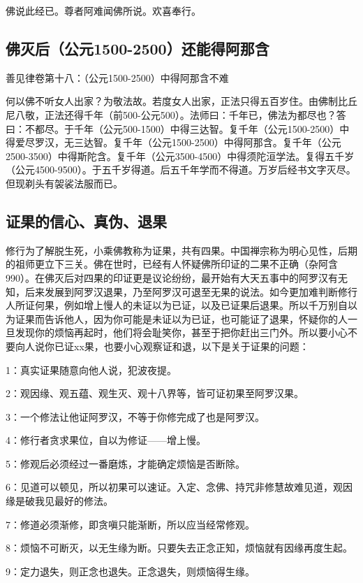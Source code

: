 \documentclass{book}
\begin{document}
佛说此经已。尊者阿难闻佛所说。欢喜奉行。

\subsection{佛灭后（公元1500-2500）还能得阿那含}

善见律卷第十八：（公元1500-2500）中得阿那含不难

何以佛不听女人出家？为敬法故。若度女人出家，正法只得五百岁住。由佛制比丘尼八敬，正法还得千年（前500-公元500）。法师曰：千年已，佛法为都尽也？答曰：不都尽。于千年（公元500-1500）中得三达智。复千年（公元1500-2500）中得爱尽罗汉，无三达智。复千年（公元1500-2500）中得阿那含。复千年（公元2500-3500）中得斯陀含。复千年（公元3500-4500）中得须陀洹学法。复得五千岁（公元4500-9500）。于五千岁得道。后五千年学而不得道。万岁后经书文字灭尽。但现剃头有袈裟法服而已。

\subsection{证果的信心、真伪、退果}

修行为了解脱生死，小乘佛教称为证果，共有四果。中国禅宗称为明心见性，后期的祖师更立下三关。佛在世时，已经有人怀疑佛所印证的二果不正确（杂阿含990）。在佛灭后对四果的印证更是议论纷纷，最开始有大天五事中的阿罗汉有无知，后来发展到阿罗汉退果，乃至阿罗汉可退至无果的说法。如今更加难判断修行人所证何果，例如增上慢人的未证以为已证，以及已证果后退果。所以千万别自以为证果而告诉他人，因为你可能是未证以为已证，也可能证了退果，怀疑你的人一旦发现你的烦恼再起时，他们将会耻笑你，甚至于把你赶出三门外。所以要小心不要向人说你已证xx果，也要小心观察证和退，以下是关于证果的问题：

1：真实证果随意向他人说，犯波夜提。

2：观因缘、观五蕴、观生灭、观十八界等，皆可证初果至阿罗汉果。

3：一个修法让他证阿罗汉，不等于你修完成了也是阿罗汉。

4：修行者贪求果位，自以为修证——增上慢。

5：修观后必须经过一番磨炼，才能确定烦恼是否断除。

6：见道可以顿见，所以初果可以速证。入定、念佛、持咒非修慧故难见道，观因缘是破我见最好的修法。

7：修道必须渐修，即贪嗔只能渐断，所以应当经常修观。

8：烦恼不可断灭，以无生缘为断。只要失去正念正知，烦恼就有因缘再度生起。

9：定力退失，则正念也退失。正念退失，则烦恼得生缘。
\end{document}
